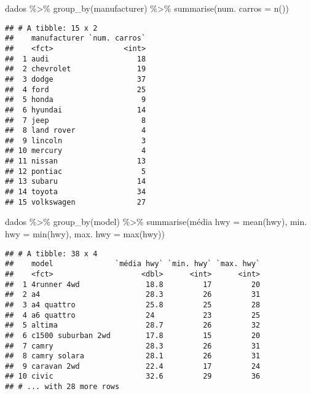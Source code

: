 \documentclass[
]{book}
\newenvironment{Shaded}{\begin{snugshade}}{\end{snugshade}}
\newcommand{\AttributeTok}[1]{\textcolor[rgb]{0.77,0.63,0.00}{#1}}
\newcommand{\FunctionTok}[1]{\textcolor[rgb]{0.00,0.00,0.00}{#1}}
\newcommand{\NormalTok}[1]{#1}
\newcommand{\OtherTok}[1]{\textcolor[rgb]{0.56,0.35,0.01}{#1}}
\newcommand{\SpecialCharTok}[1]{\textcolor[rgb]{0.00,0.00,0.00}{#1}}
\newcommand{\StringTok}[1]{\textcolor[rgb]{0.31,0.60,0.02}{#1}}
\begin{document}
\begin{Shaded}
\begin{Highlighting}[]
\NormalTok{dados }\SpecialCharTok{\%\textgreater{}\%} 
  \FunctionTok{group\_by}\NormalTok{(manufacturer) }\SpecialCharTok{\%\textgreater{}\%}
  \FunctionTok{summarise}\NormalTok{(}\StringTok{\textasciigrave{}}\AttributeTok{num. carros}\StringTok{\textasciigrave{}} \OtherTok{=} \FunctionTok{n}\NormalTok{())}
\end{Highlighting}
\end{Shaded}

\begin{verbatim}
## # A tibble: 15 x 2
##    manufacturer `num. carros`
##    <fct>                <int>
##  1 audi                    18
##  2 chevrolet               19
##  3 dodge                   37
##  4 ford                    25
##  5 honda                    9
##  6 hyundai                 14
##  7 jeep                     8
##  8 land rover               4
##  9 lincoln                  3
## 10 mercury                  4
## 11 nissan                  13
## 12 pontiac                  5
## 13 subaru                  14
## 14 toyota                  34
## 15 volkswagen              27
\end{verbatim}

\begin{Shaded}
\begin{Highlighting}[]
\NormalTok{dados }\SpecialCharTok{\%\textgreater{}\%} 
  \FunctionTok{group\_by}\NormalTok{(model) }\SpecialCharTok{\%\textgreater{}\%}
  \FunctionTok{summarise}\NormalTok{(}\StringTok{\textasciigrave{}}\AttributeTok{média hwy}\StringTok{\textasciigrave{}} \OtherTok{=} \FunctionTok{mean}\NormalTok{(hwy),}
          \StringTok{\textasciigrave{}}\AttributeTok{min. hwy}\StringTok{\textasciigrave{}} \OtherTok{=} \FunctionTok{min}\NormalTok{(hwy),}
          \StringTok{\textasciigrave{}}\AttributeTok{max. hwy}\StringTok{\textasciigrave{}} \OtherTok{=} \FunctionTok{max}\NormalTok{(hwy))}
\end{Highlighting}
\end{Shaded}

\begin{verbatim}
## # A tibble: 38 x 4
##    model              `média hwy` `min. hwy` `max. hwy`
##    <fct>                    <dbl>      <int>      <int>
##  1 4runner 4wd               18.8         17         20
##  2 a4                        28.3         26         31
##  3 a4 quattro                25.8         25         28
##  4 a6 quattro                24           23         25
##  5 altima                    28.7         26         32
##  6 c1500 suburban 2wd        17.8         15         20
##  7 camry                     28.3         26         31
##  8 camry solara              28.1         26         31
##  9 caravan 2wd               22.4         17         24
## 10 civic                     32.6         29         36
## # ... with 28 more rows
\end{verbatim}
\end{document}

